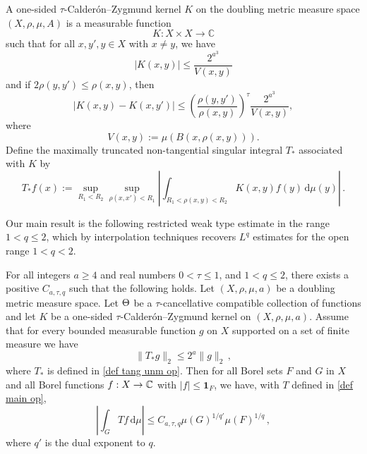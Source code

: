 A one-sided $\tau$-Calder\'on--Zygmund kernel $K$ on  the doubling metric measure space $(X, \rho, \mu, A)$ is a measurable function
    \begin{equation}\label{eqkernel0}
K:X\times X\to \mathbb{C}
    \end{equation}
such that for all $x,y',y\in X$ with $x\neq y$, we have
\begin{equation}\label{eqkernel size}
    |K(x,y)| \leq \frac{2^{a^3}}{V(x,y)}
    \end{equation}
    and if $2\rho(y,y') \leq \rho(x,y)$, then
    \begin{equation}
    \label{eqkernel y smooth}
        |K(x,y) - K(x,y')| \leq \left(\frac{\rho(y,y')}{\rho(x,y)}\right)^{\tau}\frac{2^{a^3}}{V(x,y)},
\end{equation}
where  \[V(x,y):=\mu(B(x,\rho(x,y))).\]
Define the maximally truncated non-tangential singular integral $T_{*}$ associated with $K$ by
\begin{equation}
    \label{def tang unm op}
    T_{*}f(x):=\sup_{R_1 < R_2} \sup_{\rho(x,x')<R_1} \left|\int_{R_1< \rho(x,y) < R_2}  K(x,y) f(y)  \, \mathrm{d}\mu(y) \right|\,.
\end{equation}

 
Our main result  is the following restricted weak type estimate in the range $1<q\le 2$, which by interpolation techniques recovers $L^q$ estimates for the open range
$1<q<2$.
\begin{theorem}
\label{thm main 1}
    For all  integers $a \ge  4$ and real numbers
    $0 < \tau\leq 1$,  and  $1<q\le 2$,
    there exists a positive $C_{a,\tau, q}$ such that the following holds.
    Let $(X,\rho,\mu,a)$ be a doubling metric measure space. Let  $\Theta$ be a
    $\tau$-cancellative compatible  collection of functions and let $K$ be a one-sided $\tau$-Calder\'on--Zygmund kernel on $(X,\rho,\mu,a)$. Assume  that for every bounded measurable function $g$ on $X$ supported on a set of finite measure we have
    \begin{equation}\label{nontanbound}
        \|T_{*}g\|_{2} \leq 2^a \|g\|_2\,,
    \end{equation}
    where $T_{*}$ is defined in
\eqref{def tang unm op}.
    Then for all Borel sets $F$ and $G$ in $X$ and
    all Borel functions $f:X\to \mathbb{C}$ with
    $|f|\le \mathbf{1}_F$, we have, with $T$ defined in  \eqref{def main op},
    \begin{equation}
    \label{resweak}
        \left|\int_{G} T f \, \mathrm{d}\mu\right| \leq C_{a,\tau, q} \mu(G)^{1/q'} \mu(F)^{1/q}\,,
        \end{equation}
where $q'$ is the dual exponent to $q$.
\end{theorem}


